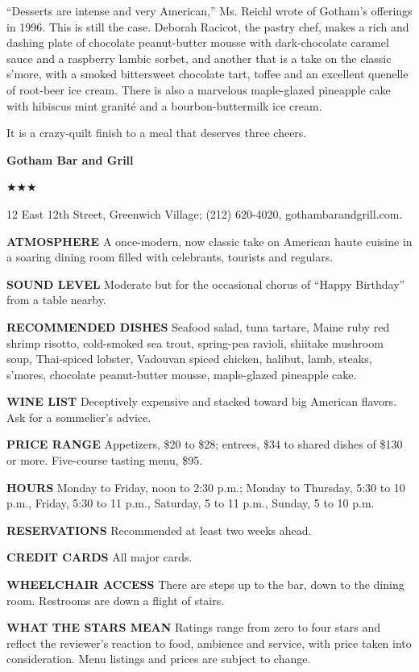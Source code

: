 ``Desserts are intense and very American,'' Ms. Reichl wrote of Gotham's
offerings in 1996. This is still the case. Deborah Racicot, the pastry
chef, makes a rich and dashing plate of chocolate peanut-butter mousse
with dark-chocolate caramel sauce and a raspberry lambic sorbet, and
another that is a take on the classic s'more, with a smoked bittersweet
chocolate tart, toffee and an excellent quenelle of root-beer ice cream.
There is also a marvelous maple-glazed pineapple cake with hibiscus mint
granité and a bourbon-buttermilk ice cream.

It is a crazy-quilt finish to a meal that deserves three cheers.

\textbf{Gotham Bar and Grill}

★★★

12 East 12th Street, Greenwich Village; (212) 620-4020,
gothambarandgrill.com.

\textbf{ATMOSPHERE} A once-modern, now classic take on American haute
cuisine in a soaring dining room filled with celebrants, tourists and
regulars.

\textbf{SOUND LEVEL} Moderate but for the occasional chorus of ``Happy
Birthday'' from a table nearby.

\textbf{RECOMMENDED DISHES} Seafood salad, tuna tartare, Maine ruby red
shrimp risotto, cold-smoked sea trout, spring-pea ravioli, shiitake
mushroom soup, Thai-spiced lobster, Vadouvan spiced chicken, halibut,
lamb, steaks, s'mores, chocolate peanut-butter mousse, maple-glazed
pineapple cake.

\textbf{WINE LIST} Deceptively expensive and stacked toward big American
flavors. Ask for a sommelier's advice.

\textbf{PRICE RANGE} Appetizers, \$20 to \$28; entrees, \$34 to shared
dishes of \$130 or more. Five-course tasting menu, \$95.

\textbf{HOURS} Monday to Friday, noon to 2:30 p.m.; Monday to Thursday,
5:30 to 10 p.m., Friday, 5:30 to 11 p.m., Saturday, 5 to 11 p.m.,
Sunday, 5 to 10 p.m.

\textbf{RESERVATIONS} Recommended at least two weeks ahead.

\textbf{CREDIT CARDS} All major cards.

\textbf{WHEELCHAIR ACCESS} There are steps up to the bar, down to the
dining room. Restrooms are down a flight of stairs.

\textbf{WHAT THE STARS MEAN} Ratings range from zero to four stars and
reflect the reviewer's reaction to food, ambience and service, with
price taken into consideration. Menu listings and prices are subject to
change.


